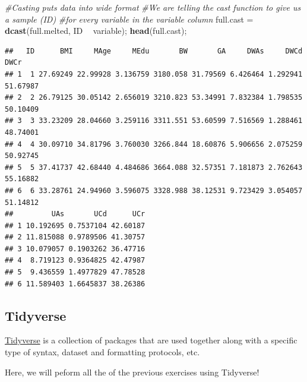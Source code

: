 \documentclass[
]{book}
\newenvironment{Shaded}{\begin{snugshade}}{\end{snugshade}}
\newcommand{\CommentTok}[1]{\textcolor[rgb]{0.56,0.35,0.01}{\textit{#1}}}
\newcommand{\KeywordTok}[1]{\textcolor[rgb]{0.13,0.29,0.53}{\textbf{#1}}}
\newcommand{\NormalTok}[1]{#1}
\newcommand{\OperatorTok}[1]{\textcolor[rgb]{0.81,0.36,0.00}{\textbf{#1}}}
\newcommand{\StringTok}[1]{\textcolor[rgb]{0.31,0.60,0.02}{#1}}
\begin{document}
\begin{Shaded}
\begin{Highlighting}[]
\CommentTok{#Casting puts data into wide format}
\CommentTok{#We are telling the cast function to give us a sample (ID) }
\CommentTok{#for every variable in the variable column}
\NormalTok{full.cast =}\StringTok{ }\KeywordTok{dcast}\NormalTok{(full.melted, ID }\OperatorTok{~}\StringTok{ }\NormalTok{variable);}
\KeywordTok{head}\NormalTok{(full.cast);}
\end{Highlighting}
\end{Shaded}

\begin{verbatim}
##   ID      BMI     MAge     MEdu       BW       GA     DWAs     DWCd     DWCr
## 1  1 27.69249 22.99928 3.136759 3180.058 31.79569 6.426464 1.292941 51.67987
## 2  2 26.79125 30.05142 2.656019 3210.823 53.34991 7.832384 1.798535 50.10409
## 3  3 33.23209 28.04660 3.259116 3311.551 53.60599 7.516569 1.288461 48.74001
## 4  4 30.09710 34.81796 3.760030 3266.844 18.60876 5.906656 2.075259 50.92745
## 5  5 37.41737 42.68440 4.484686 3664.088 32.57351 7.181873 2.762643 55.16882
## 6  6 33.28761 24.94960 3.596075 3328.988 38.12531 9.723429 3.054057 51.14812
##         UAs       UCd      UCr
## 1 10.192695 0.7537104 42.60187
## 2 11.815088 0.9789506 41.30757
## 3 10.079057 0.1903262 36.47716
## 4  8.719123 0.9364825 42.47987
## 5  9.436559 1.4977829 47.78528
## 6 11.589403 1.6645837 38.26386
\end{verbatim}

\hypertarget{tidyverse}{%
\subsection{Tidyverse}\label{tidyverse}}

\href{https://www.tidyverse.org}{Tidyverse} is a collection of packages that are used together along with a specific type of syntax, dataset and formatting protocols, etc.

Here, we will peform all the of the previous exercises using Tidyverse!
\end{document}
